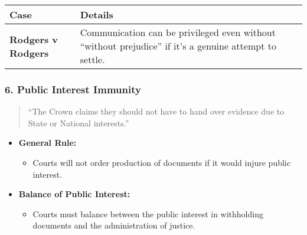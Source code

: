 \begin{longtable}[]{@{}
  >{\raggedright\arraybackslash}p{}
  >{\raggedright\arraybackslash}p{}@{}}
\toprule\noalign{}
\begin{minipage}[b]{\linewidth}\raggedright
\textbf{Case}
\end{minipage} & \begin{minipage}[b]{\linewidth}\raggedright
\textbf{Details}
\end{minipage} \\
\midrule\noalign{}
\endhead
\bottomrule\noalign{}
\endlastfoot
\textbf{Rodgers v Rodgers} & Communication can be privileged even
without ``without prejudice'' if it's a genuine attempt to settle. \\
\end{longtable}

\subsubsection{\texorpdfstring{6. \textbf{Public Interest
Immunity}}{6. Public Interest Immunity}}\label{public-interest-immunity}

\begin{quote}
``The Crown claims they should not have to hand over evidence due to
State or National interests.''
\end{quote}

\begin{itemize}
\tightlist
\item
  \textbf{General Rule:}

  \begin{itemize}
  \tightlist
  \item
    Courts will not order production of documents if it would injure
    public interest.
  \end{itemize}
\item
  \textbf{Balance of Public Interest:}

  \begin{itemize}
  \tightlist
  \item
    Courts must balance between the public interest in withholding
    documents and the administration of justice.
  \end{itemize}
\end{itemize}

